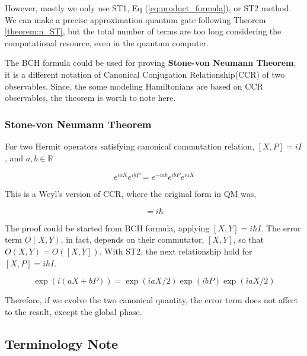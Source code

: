 However, mostly we only use ST1, Eq (\ref{eq:product_formula}), or ST2 method.
We can make a precise approximation quantum gate following Theorem \ref{theorem:n_ST},
but the total number of terms are too long considering the computational resource, 
even in the quantum computer.

The BCH formula could be used for proving \textbf{Stone-von Neumann Theorem},
it is a different notation of Canonical Conjugation Relationship(CCR) of two observables.
Since, the some modeling Hamiltonians are based on CCR observables,
the theorem is worth to note here.

\subsubsection{Stone-von Neumann Theorem}

\begin{theorem}  %
    For two Hermit operators satisfying canonical commutation relation, 
    $[X, P] = i I$,
    and $a, b \in \mathbb{R}$
    
    \begin{equation}
        e^{i a X} e^{i b P} = e^{- i ab} e^{i bP} e^{iaX}
    \end{equation}
\end{theorem}

This is a Weyl's version of CCR, where the original form in QM was,

\begin{equation}
    [x, p] = i \hbar
\end{equation}

The proof could be started from BCH formula, applying $[X, Y] = i \hbar I$.
The error term $O(X, Y)$, in fact, depends on their commutator, $[X, Y]$, 
so that $O(X, Y) = O([X, Y])$\cite{PhysRevX.11.011020}. 
With ST2, the next relationship hold for $[X, P] = i\hbar I$.

\begin{equation}
    \exp(i (a X + b P)) = \exp(i a X/2) \exp(i b P) \exp(i a X/2)
\end{equation}

Therefore, if we evolve the two canonical quantity,
the error term does not affect to the result, except the global phase.

\subsection{Terminology Note}

